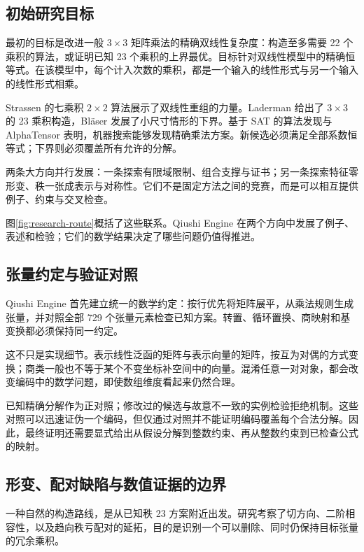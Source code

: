 \subsection{初始研究目标}\label{route:problem}

最初的目标是改进一般 $3\times3$ 矩阵乘法的精确双线性复杂度：构造至多需要 22 个乘积的算法，或证明已知 23 个乘积的上界最优。目标针对双线性模型中的精确恒等式。在该模型中，每个计入次数的乘积，都是一个输入的线性形式与另一个输入的线性形式相乘。

Strassen 的七乘积 $2\times2$ 算法展示了双线性重组的力量\cite{strassen1969gaussian}。Laderman 给出了 $3\times3$ 的 23 乘积构造\cite{laderman1976noncommutative}，Bläser 发展了小尺寸情形的下界\cite{blaser2003}。基于 SAT 的算法发现与 AlphaTensor 表明，机器搜索能够发现精确乘法方案\cite{heule2019waysa,alphatensor2022}。新候选必须满足全部系数恒等式；下界则必须覆盖所有允许的分解。

两条大方向并行发展：一条探索有限域限制、组合支撑与证书；另一条探索特征零形变、秩一张成表示与对称性。它们不是固定方法之间的竞赛，而是可以相互提供例子、约束与交叉检查。

图\ref{fig:research-route}概括了这些联系。Qiushi Engine 在两个方向中发展了例子、表述和检验；它们的数学结果决定了哪些问题仍值得推进。

\subsection{张量约定与验证对照}\label{route:controls}

Qiushi Engine 首先建立统一的数学约定：按行优先将矩阵展平，从乘法规则生成张量，并对照全部 729 个张量元素检查已知方案。转置、循环置换、商映射和基变换都必须保持同一约定。

这不只是实现细节。表示线性泛函的矩阵与表示向量的矩阵，按互为对偶的方式变换；商类一般也不等于某个不变坐标补空间中的向量。混淆任意一对对象，都会改变编码中的数学问题，即使数组维度看起来仍然合理。

已知精确分解作为正对照；修改过的候选与故意不一致的实例检验拒绝机制。这些对照可以迅速证伪一个编码，但仅通过对照并不能证明编码覆盖每个合法分解。因此，最终证明还需要显式给出从假设分解到整数约束、再从整数约束到已检查公式的映射。

\subsection{形变、配对缺陷与数值证据的边界}\label{route:deformation}

一种自然的构造路线，是从已知秩 23 方案附近出发。研究考察了切方向、二阶相容性，以及趋向秩亏配对的延拓，目的是识别一个可以删除、同时仍保持目标张量的冗余乘积。

